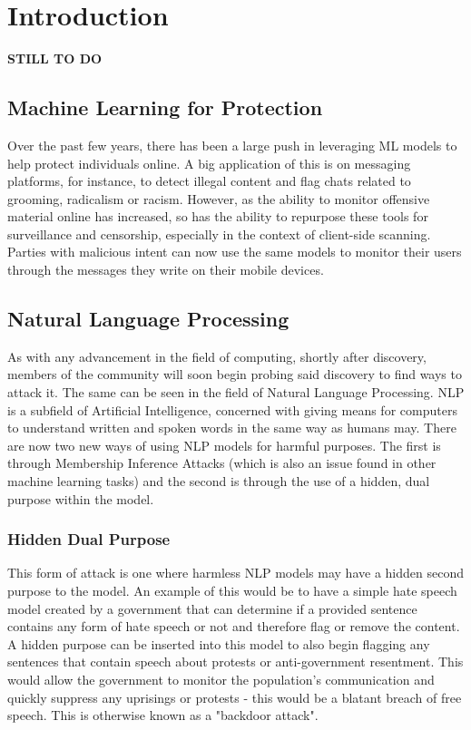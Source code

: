 \chapter{Introduction}

\textbf{STILL TO DO}

\section{Machine Learning for Protection}

Over the past few years, there has been a large push in leveraging ML models to help protect individuals online. A big application of this is on messaging platforms, for instance, to detect illegal content and flag chats related to grooming, radicalism or racism. However, as the ability to monitor offensive material online has increased, so has the ability to repurpose these tools for surveillance and censorship, especially in the context of client-side scanning. Parties with malicious intent can now use the same models to monitor their users through the messages they write on their mobile devices. 

\section{Natural Language Processing}

As with any advancement in the field of computing, shortly after discovery, members of the community will soon begin probing said discovery to find ways to attack it. The same can be seen in the field of Natural Language Processing. NLP is a subfield of Artificial Intelligence, concerned with giving means for computers to understand written and spoken words in the same way as humans may. There are now two new ways of using NLP models for harmful purposes. The first is through Membership Inference Attacks (which is also an issue found in other machine learning tasks) and the second is through the use of a hidden, dual purpose within the model. 

\subsection{Hidden Dual Purpose}

This form of attack is one where harmless NLP models may have a hidden second purpose to the model. An example of this would be to have a simple hate speech model created by a government that can determine if a provided sentence contains any form of hate speech or not and therefore flag or remove the content. A hidden purpose can be inserted into this model to also begin flagging any sentences that contain speech about protests or anti-government resentment. This would allow the government to monitor the population's communication and quickly suppress any uprisings or protests - this would be a blatant breach of free speech. This is otherwise known as a "backdoor attack".

